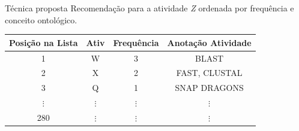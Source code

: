\begin{frame}		
	\begin{block}{Técnica proposta}
		Recomendação para a atividade \emph{Z} ordenada por frequência e conceito ontológico.
		\begin{table}[!htb]
			\centering
			\begin{tabular}{|c|c|c|c|}  \hline
				\textbf{Posição na Lista} & \textbf{Ativ} & \textbf{Frequência} & \textbf{Anotação Atividade} 	\\ \hline
				1				& W 				& 3 				& BLAST				\\ \hline
				2				& X 				& 2 				& FAST, CLUSTAL		\\ \hline
				3				& Q 				& 1 				& SNAP DRAGONS		\\ \hline
				\(\vdots\)		& \(\vdots\)		& \(\vdots\) 		& \(\vdots\)		\\ \hline
				280				& \(\vdots\)		& \(\vdots\)		& \(\vdots\)	\\ \hline
			\end{tabular}
			\label{tabela_lista_recomendacao_ordenada_frequencia}
		\end{table}		
	\end{block}
\end{frame}
